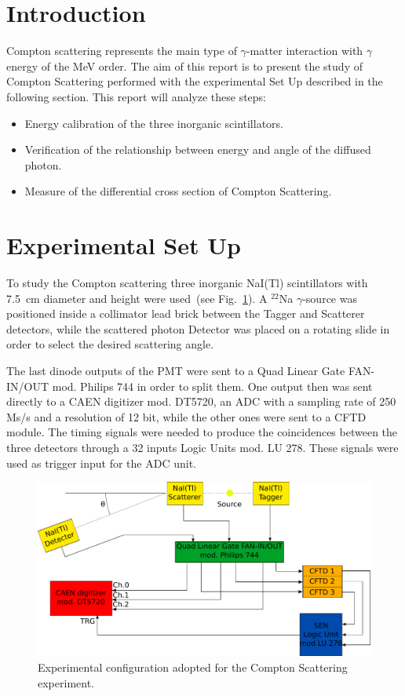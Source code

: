\section*{Introduction}

Compton scattering represents the main  type of $\gamma$-matter interaction with $\gamma$ energy of the MeV order.   
The aim of this report is to present the study of Compton Scattering performed with the experimental Set Up described in the following section.
This report will analyze these steps:
\begin{itemize}
	\item Energy calibration of the three inorganic scintillators.
	\item Verification of the relationship between energy and angle of the diffused photon.
	\item Measure of the differential cross section of Compton Scattering.
\end{itemize}

\section*{Experimental Set Up}

To study the Compton scattering three inorganic NaI(Tl) scintillators with 7.5~cm diameter and height were used~(see Fig.~\ref{Fig:Set_up}). A $^{22}$Na $\gamma$-source was positioned inside a collimator lead brick between the Tagger and Scatterer detectors, while the scattered photon Detector was placed on a rotating slide in order to select the desired scattering angle.

The last dinode outputs of the PMT were sent to a Quad Linear Gate FAN-IN/OUT mod. Philips 744 in order to split them. One output then was sent directly to a CAEN digitizer mod. DT5720, an ADC with a sampling rate of 250 Ms/s and a resolution of 12 bit, while the other ones were sent to a  CFTD module. The timing signals were needed to produce the coincidences between the three detectors through a 32 inputs Logic Units mod. LU 278. These signals were used as trigger input for the ADC unit.

\begin{figure}[h!]
	\centering
	\includegraphics[width=\textwidth]{immagini/SetUp.pdf}
	\caption{Experimental configuration adopted for the Compton Scattering experiment.}
	\label{Fig:Set_up}
\end{figure}
